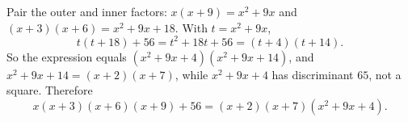 Pair the outer and inner factors: $x(x+9)=x^2+9x$ and $(x+3)(x+6)=x^2+9x+18$. With $t=x^2+9x$,
\[t(t+18)+56=t^2+18t+56=(t+4)(t+14).\]
So the expression equals $(x^2+9x+4)(x^2+9x+14)$, and $x^2+9x+14=(x+2)(x+7)$, while $x^2+9x+4$ has discriminant $65$, not a square. Therefore
\[x(x+3)(x+6)(x+9)+56=\boxed{(x+2)(x+7)(x^2+9x+4)}.\]
